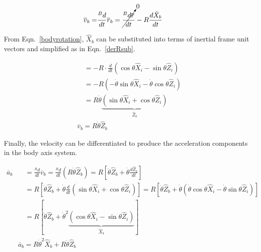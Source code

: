 \documentclass[]{aiaa-tc}%
\begin{document}
\begin{equation} \label{derR}
\begin{split}
  \overline{v}_b =& \frac{^Bd}{dt} \overline{r}_b = \cancelto{0}{\frac{^Bd\overline{r}}{dt}} - R \frac{d\hat{X}_b}{dt}
\end{split}
\end{equation}

\noindent From Eqn.~\ref{bodyrotation}, $\hat{X}_b$ can be substituted into terms of inertial frame unit vectors and simplified as in Eqn.~\ref{derRsub}.

\begin{equation} \label{derRsub}
\begin{split}
  &\quad= -R \cdot \frac{d}{dt} \left( \cos\theta\hat{X}_i - \sin\theta\hat{Z}_i  \right) \\
  &\quad= -R \left( -\dot{\theta}\sin\theta\hat{X}_i - \dot{\theta}\cos\theta\hat{Z}_i \right) \\
  &\quad= R\dot{\theta} \underbrace{ \left( \sin\theta\hat{X}_i + \cos\theta\hat{Z}_i \right) }_{\hat{Z}_b} \\
  &\boxed{\overline{v}_b = R\dot{\theta}\hat{Z}_b}
\end{split}
\end{equation}

\noindent Finally, the velocity can be differentiated to produce the acceleration components in the body axis system.

\begin{equation} \label{derV}
\begin{split}
  \overline{a}_b &\quad= \frac{^Bd}{dt} \overline{v}_b = \frac{^Bd}{dt}(R\dot{\theta}\hat{Z}_b) =  R \left[ \ddot{\theta}\hat{Z}_b + \dot{\theta}\frac{d\hat{Z}_b}{dt}\right] \\
  &\quad= R \left[ \ddot{\theta}\hat{Z}_b + \dot{\theta} \frac{d}{dt}(\sin\theta\hat{X}_i + \cos\theta\hat{Z}_i)\right]
  =  R \left[ \ddot{\theta}\hat{Z}_b + \dot{\theta} (\dot{\theta}\cos\theta\hat{X}_i - \dot{\theta}\sin\theta\hat{Z}_i)\right] \\
  &\quad= R [ \ddot{\theta}\hat{Z}_b + \dot{\theta}^2 \underbrace{ (\cos\theta\hat{X}_i - \sin\theta\hat{Z}_i) }_{\hat{X}_b} ] \\
  &\boxed{\overline{a}_b = R\dot{\theta}^2 \hat{X}_b + R\ddot{\theta} \hat{Z}_b}
\end{split}
\end{equation}
\end{document}
